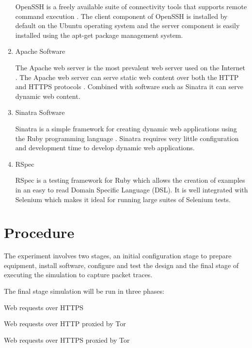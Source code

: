 \begin{enumerate}
  OpenSSH is a freely available suite of connectivity tools
  \parencite{:2010zr,:ve} that supports remote command execution
  \parencite{Tucker:2010ly, :2010zr}. The client component of OpenSSH is
  installed by default on the Ubuntu operating system and the server component
  is easily installed using the apt-get package management system.

  \item Apache Software

  The Apache web server is the most prevalent web server used on the Internet
  \parencite{2010:dq}. The Apache web server can serve static web content over
  both the HTTP and HTTPS protocols \parencite{Foundation:2011uq}. Combined with
  software such as Sinatra it can serve dynamic web content.

  \item Sinatra Software

  Sinatra is a simple framework for creating dynamic web applications using the
  Ruby programming language \parencite{:2010bh}. Sinatra requires very little
  configuration and development time to develop dynamic web applications.

  \item RSpec

  RSpec is a testing framework for Ruby which allows the creation of examples in
  an easy to read Domain Specific Language (DSL). It is well integrated with
  Selenium which makes it ideal for running large suites of Selenium tests.

\end{enumerate}

\section{Procedure}

The experiment involves two stages, an initial configuration stage to prepare
equipment, install software, configure and test the design and the final stage
of executing the simulation to capture packet traces.

The final stage simulation will be run in three phases:

\begin{enumerate*}
  \item Web requests over HTTPS
  \item Web requests over HTTP proxied by Tor
  \item Web requests over HTTPS proxied by Tor
\end{enumerate*}

